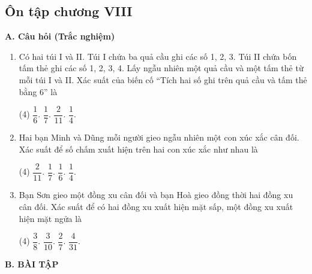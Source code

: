 \begin{practice}
    \subsection{Ôn tập chương VIII}

    \textbf{A. Câu hỏi (Trắc nghiệm)}

    \begin{enumerate}
        \item Có hai túi I và II. Túi I chứa ba quả cầu ghi các số 1, 2, 3. Túi II chứa bốn tấm thẻ ghi các số 1, 2, 3, 4. Lấy ngẫu nhiên một quả cầu và một tấm thẻ từ mỗi túi I và II. Xác suất của biến cố “Tích hai số ghi trên quả cầu và tấm thẻ bằng 6” là
        \begin{tasks}(4)
            \task $\dfrac{1}{6}$.
            \task $\dfrac{1}{7}$.
            \task $\dfrac{2}{11}$.
            \task $\dfrac{1}{4}$.
        \end{tasks}
        \par\noindent\answerbox\par

        \item Hai bạn Minh và Dũng mỗi người gieo ngẫu nhiên một con xúc xắc cân đối. Xác suất để số chấm xuất hiện trên hai con xúc xắc như nhau là
        \begin{tasks}(4)
            \task $\dfrac{2}{11}$.
            \task $\dfrac{1}{7}$.
            \task $\dfrac{1}{6}$.
            \task $\dfrac{1}{4}$.
        \end{tasks}
        \par\noindent\answerbox\par

        \item Bạn Sơn gieo một đồng xu cân đối và bạn Hoà gieo đồng thời hai đồng xu cân đối. Xác suất để có hai đồng xu xuất hiện mặt sấp, một đồng xu xuất hiện mặt ngửa là
        \begin{tasks}(4)
            \task $\dfrac{3}{8}$.
            \task $\dfrac{3}{10}$.
            \task $\dfrac{2}{7}$.
            \task $\dfrac{4}{31}$.
        \end{tasks}
        \par\noindent\answerbox\par
    \end{enumerate}

    \textbf{B. BÀI TẬP}


\end{practice}
